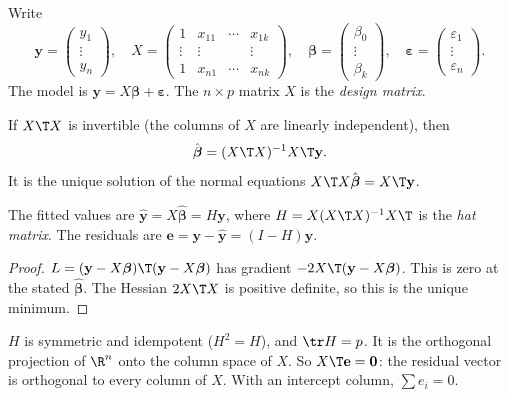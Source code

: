 Write
\[ \mathbf{y}=\begin{pmatrix}y_1\\\vdots\\y_n\end{pmatrix},\quad X=\begin{pmatrix}1&x_{11}&\cdots&x_{1k}\\\vdots&\vdots&&\vdots\\1&x_{n1}&\cdots&x_{nk}\end{pmatrix},\quad\boldsymbol\beta=\begin{pmatrix}\beta_0\\\vdots\\\beta_k\end{pmatrix},\quad\boldsymbol\varepsilon=\begin{pmatrix}\varepsilon_1\\\vdots\\\varepsilon_n\end{pmatrix}. \]
The model is $\mathbf{y}=X\boldsymbol\beta+\boldsymbol\varepsilon$. The $n\times p$ matrix $X$ is the \emph{design matrix}.

\begin{theorem}\label{thm:mlr-ls}
If $X\T X$ is invertible (the columns of $X$ are linearly independent), then
\[ \hat{\boldsymbol\beta}=(X\T X)^{-1}X\T\mathbf{y}. \]
It is the unique solution of the normal equations $X\T X\hat{\boldsymbol\beta}=X\T\mathbf{y}$.

The fitted values are $\hat{\mathbf{y}}=X\hat{\boldsymbol\beta}=H\mathbf{y}$, where $H=X(X\T X)^{-1}X\T$ is the \emph{hat matrix}. The residuals are $\mathbf{e}=\mathbf{y}-\hat{\mathbf{y}}=(I-H)\mathbf{y}$.
\end{theorem}

\begin{proof}
$L=(\mathbf{y}-X\boldsymbol\beta)\T(\mathbf{y}-X\boldsymbol\beta)$ has gradient $-2X\T(\mathbf{y}-X\boldsymbol\beta)$. This is zero at the stated $\hat{\boldsymbol\beta}$. The Hessian $2X\T X$ is positive definite, so this is the unique minimum.
\end{proof}

\begin{theorem}[Properties of $H$]\label{thm:hat}
$H$ is symmetric and idempotent ($H^2=H$), and $\tr H=p$. It is the orthogonal projection of $\R^n$ onto the column space of $X$. So $X\T\mathbf{e}=\mathbf{0}$: the residual vector is orthogonal to every column of $X$. With an intercept column, $\sum e_i=0$.
\end{theorem}

